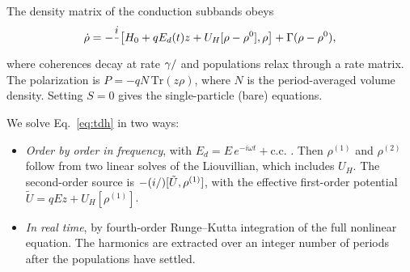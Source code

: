 \documentclass[11pt]{article}
\let\hbar\relax\DeclareRobustCommand{\hbar}{{\mathchar'26\mkern-9mu h}}
\begin{document}
The density matrix of the conduction subbands obeys
\begin{equation}
\dot\rho=-\frac{i}{\hbar}\big[H_0+qE_d(t)z+U_H[\rho-\rho^0],\rho\big]+\Gamma(\rho-\rho^0),\label{eq:tdh}
\end{equation}
where coherences decay at rate $\gamma/\hbar$ and populations relax through a rate matrix. The polarization is $P=-qN\,\mathrm{Tr}(z\rho)$, where $N$ is the period-averaged volume density. Setting $S=0$ gives the single-particle (bare) equations.

We solve Eq.~\eqref{eq:tdh} in two ways:
\begin{itemize}
\item \emph{Order by order in frequency}, with $E_d=E\,e^{-i\omega t}+\mathrm{c.c.}$ \cite{Boyd2008}. Then $\rho^{(1)}$ and $\rho^{(2)}$ follow from two linear solves of the Liouvillian, which includes $U_H$. The second-order source is $-(i/\hbar)[\tilde U,\rho^{(1)}]$, with the effective first-order potential $\tilde U=qEz+U_H[\rho^{(1)}]$.
\item \emph{In real time}, by fourth-order Runge--Kutta integration of the full nonlinear equation. The harmonics are extracted over an integer number of periods after the populations have settled.
\end{itemize}
\end{document}
